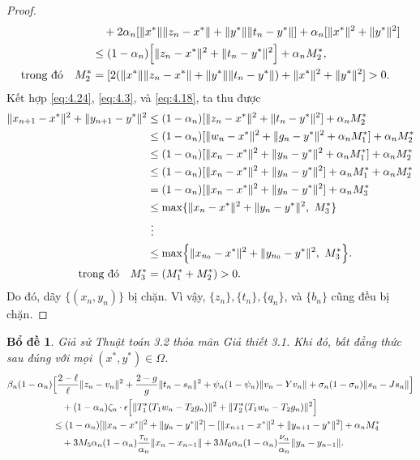 \documentclass[11pt,a4paper]{article}
\theoremstyle{plain}
\newtheorem{lemma}[theorem]{Bổ đề}
\theoremstyle{definition}
\theoremstyle{remark}
\numberwithin{equation}{section}
\newcommand{\nm}[1]{\lVert #1\rVert}
\begin{document}
\begin{proof}
\begin{align}
&\quad +2\alpha_n[\nm{x^{*}}\nm{z_n-x^{*}}+\nm{y^{*}}\nm{t_n-y^{*}}]+\alpha_n[\nm{x^{*}}^2+\nm{y^{*}}^2]\notag\\
&\le (1-\alpha_n)\Bigl[\nm{z_n-x^{*}}^2+\nm{t_n-y^{*}}^2\Bigr]+\alpha_n M_2^{*},\notag\\
\text{trong đó}\quad M_2^{*} &= [2(\nm{x^{*}}\nm{z_n-x^{*}}+\nm{y^{*}}\nm{t_n-y^{*}})+\nm{x^{*}}^2+\nm{y^{*}}^2]>0. \label{eq:4.24}
\end{align}
Kết hợp \eqref{eq:4.24}, \eqref{eq:4.3}, và \eqref{eq:4.18}, ta thu được
\begin{align*}
\nm{x_{n+1}-x^{*}}^2+\nm{y_{n+1}-y^{*}}^2 &\le (1-\alpha_n)[\nm{z_n-x^{*}}^2+\nm{t_n-y^{*}}^2]+\alpha_n M_2^{*}\\
&\le (1-\alpha_n)[\nm{w_n-x^{*}}^2+\nm{g_n-y^{*}}^2+\alpha_n M_1^{*}]+\alpha_n M_2^{*}\\
&\le (1-\alpha_n)[\nm{x_n-x^{*}}^2+\nm{y_n-y^{*}}^2+\alpha_n M_1^{*}]+\alpha_n M_2^{*}\\
&\le (1-\alpha_n)[\nm{x_n-x^{*}}^2+\nm{y_n-y^{*}}^2]+\alpha_n M_1^{*}+\alpha_n M_2^{*}\\
&= (1-\alpha_n)[\nm{x_n-x^{*}}^2+\nm{y_n-y^{*}}^2]+\alpha_n M_3^{*}\\
&\le \max\{\nm{x_n-x^{*}}^2+\nm{y_n-y^{*}}^2,\ M_3^{*}\}\\
&\ \vdots\\
&\le \max\Bigl\{\nm{x_{n_0}-x^{*}}^2+\nm{y_{n_0}-y^{*}}^2,\ M_3^{*}\Bigr\}.\\
\text{trong đó}\quad M_3^{*} &= (M_1^{*}+M_2^{*})>0.
\end{align*}
Do đó, dãy $\{(x_n,y_n)\}$ bị chặn. Vì vậy, $\{z_n\},\{t_n\},\{q_n\}$, và $\{b_n\}$ cũng đều bị chặn.
\end{proof}

\begin{lemma}\label{lem:4.5}
Giả sử Thuật toán 3.2 thỏa mãn Giả thiết 3.1. Khi đó, bất đẳng thức sau đúng với mọi $(x^{*},y^{*})\in\Omega$.
\begin{align*}
\beta_n(1-\alpha_n) &\Bigl[\frac{2-\ell}{\ell}\nm{z_n-v_n}^2+\frac{2-g}{g}\nm{t_n-s_n}^2+\psi_n(1-\psi_n)\nm{v_n-Yv_n}+\sigma_n(1-\sigma_n)\nm{s_n-Js_n}\Bigr]\\
&\quad +(1-\alpha_n)\zeta_n\cdot\epsilon\Bigl[\nm{T_1^{*}(T_1w_n-T_2g_n)}^2+\nm{T_2^{*}(T_1w_n-T_2g_n)}^2\Bigr]\\
&\le (1-\alpha_n)[\nm{x_n-x^{*}}^2+\nm{y_n-y^{*}}^2]-[\nm{x_{n+1}-x^{*}}^2+\nm{y_{n+1}-y^{*}}^2]+\alpha_n M_4^{*}\\
&\quad +3M_5\alpha_n(1-\alpha_n)\frac{\tau_n}{\alpha_n}\nm{x_n-x_{n-1}}+3M_6\alpha_n(1-\alpha_n)\frac{\nu_n}{\alpha_n}\nm{y_n-y_{n-1}}.
\end{align*}
\end{lemma}
\end{document}
